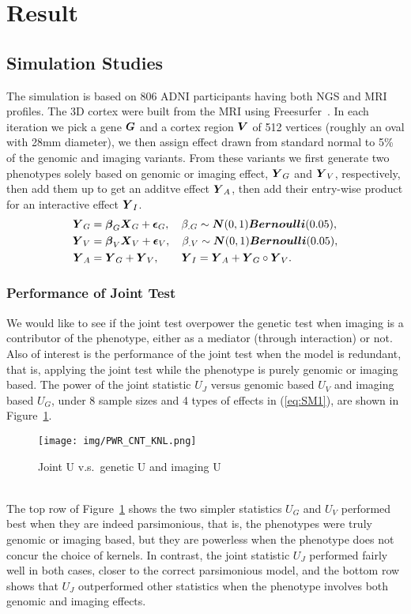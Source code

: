 \section{Result}
\subsection{Simulation Studies}
The simulation is based on 806 ADNI participants having both NGS and MRI profiles. The 3D cortex were built from the MRI using Freesurfer~\cite{FS:Intro}. In each iteration we pick a gene $\boldsymbol{G}$ and a cortex region $\boldsymbol{V}$ of 512 vertices (roughly an oval with 28mm diameter), we then assign effect drawn from standard normal to 5\% of the genomic and imaging variants. From these variants we first generate two phenotypes solely based on genomic or imaging effect, $\boldsymbol{Y}_G$ and $\boldsymbol{Y}_V$, respectively, then add them up to get an additve effect $\boldsymbol{Y}_A$, then add their entry-wise product for an interactive effect $\boldsymbol{Y}_I$.
\begin{equation}\label{eq:SM1}
  \begin{split}
    \boldsymbol{Y}_G &= \boldsymbol{\beta}_G \boldsymbol{X}_G + \boldsymbol{\epsilon}_G, \quad \beta_{.G} \sim \boldsymbol{N}(0,1) \boldsymbol{Bernoulli}(0.05), \\
    \boldsymbol{Y}_V &= \boldsymbol{\beta}_V \boldsymbol{X}_V + \boldsymbol{\epsilon}_V, \quad \beta_{.V} \sim \boldsymbol{N}(0,1) \boldsymbol{Bernoulli}(0.05), \\
    \boldsymbol{Y}_A &= \boldsymbol{Y}_G + \boldsymbol{Y}_V, \qquad \boldsymbol{Y}_I = \boldsymbol{Y}_A + \boldsymbol{Y}_G \circ \boldsymbol{Y}_V.
  \end{split}
\end{equation}

\subsubsection{Performance of Joint Test}
We would like to see if the joint test overpower the genetic test when imaging is a contributor of the phenotype, either as a mediator (through interaction) or not. Also of interest is the performance of the joint test when the model is redundant, that is, applying the joint test while the phenotype is purely genomic or imaging based. The power of the joint statistic $U_J$ versus genomic based $U_V$ and imaging based $U_G$, under 8 sample sizes and 4 types of effects in (\ref{eq:SM1}), are shown in Figure~\ref{fig:PWR_CNT_KNL}.
\begin{figure}[!htbp]
  \centering
  \texttt{[image: img/PWR\_CNT\_KNL.png]}
  \caption{Joint U v.s.\ genetic U and imaging U}\label{fig:PWR_CNT_KNL}
\end{figure} \\
The top row of Figure~\ref{fig:PWR_CNT_KNL} shows the two simpler statistics $U_G$ and $U_V$ performed best when they are indeed parsimonious, that is, the phenotypes were truly genomic or imaging based, but they are powerless when the phenotype does not concur the choice of kernels. In contrast, the joint statistic $U_J$ performed fairly well in both cases, closer to the correct parsimonious model, and the bottom row shows that $U_J$ outperformed other statistics when the phenotype involves both genomic and imaging effects.

